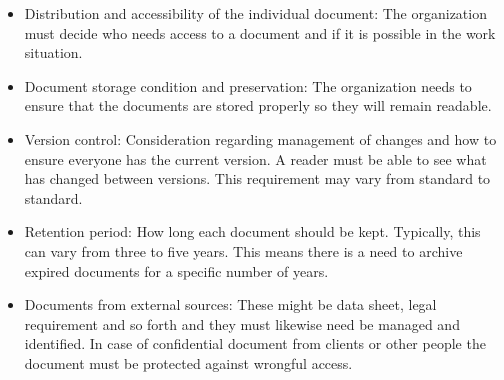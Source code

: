 \begin{itemize}
	\item
	Distribution and accessibility of the individual document:
	The organization must decide who needs access to a document and if it is possible in the work situation.
	\item
	Document storage condition and preservation:
	The organization needs to ensure that the documents are stored properly so they will remain readable.
	\item
	Version control:
	Consideration regarding management of changes and how to ensure everyone has the current version.
	A reader must be able to see what has changed between versions.
	This requirement may vary from standard to standard.
	\item
	Retention period:
	How long each document should be kept.
	Typically, this can vary from three to five years.
	This means there is a need to archive expired documents for a specific number of years.
	\item
	Documents from external sources:
	These might be data sheet, legal requirement and so forth and they must likewise need be managed and identified.
	In case of confidential document from clients or other people the document must be protected against wrongful access.
\end{itemize}



